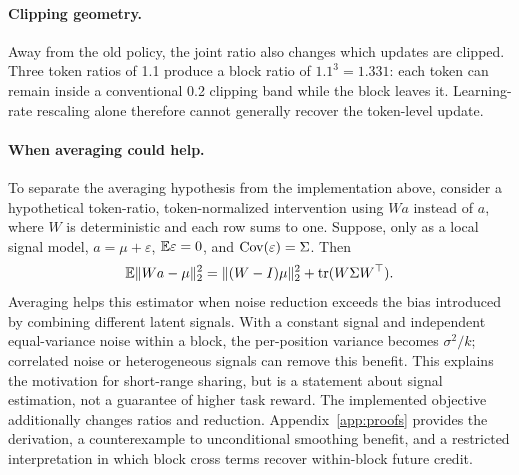 \paragraph{Clipping geometry.}
Away from the old policy, the joint ratio also changes which updates are clipped. Three token ratios of 1.1 produce a block ratio of $1.1^3=1.331$: each token can remain inside a conventional 0.2 clipping band while the block leaves it. Learning-rate rescaling alone therefore cannot generally recover the token-level update.

\paragraph{When averaging could help.}
To separate the averaging hypothesis from the implementation above, consider a hypothetical token-ratio, token-normalized intervention using $Wa$ instead of $a$, where $W$ is deterministic and each row sums to one. Suppose, only as a local signal model, $a=\mu+\varepsilon$, $\mathbb{E}\varepsilon=0$, and $\operatorname{Cov}(\varepsilon)=\Sigma$. Then
\begin{equation}
 \mathbb{E}\|Wa-\mu\|_2^2=\|(W-I)\mu\|_2^2+\operatorname{tr}(W\Sigma W^\top).
 \label{eq:mse}
\end{equation}
Averaging helps this estimator when noise reduction exceeds the bias introduced by combining different latent signals. With a constant signal and independent equal-variance noise within a block, the per-position variance becomes $\sigma^2/k$; correlated noise or heterogeneous signals can remove this benefit. This explains the motivation for short-range sharing, but is a statement about signal estimation, not a guarantee of higher task reward. The implemented objective additionally changes ratios and reduction. Appendix~\ref{app:proofs} provides the derivation, a counterexample to unconditional smoothing benefit, and a restricted interpretation in which block cross terms recover within-block future credit.
